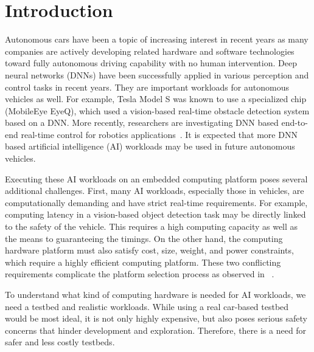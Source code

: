 \section{Introduction} \label{sec:intro}

%
%
Autonomous cars have been a topic of increasing interest in recent
years as many companies are actively developing related hardware
and software technologies toward fully autonomous driving capability with
no human intervention. Deep neural networks (DNNs) have been
successfully applied in various perception and control tasks in
recent years.  They are important workloads for autonomous vehicles
as well. For example, Tesla Model S was known to use a specialized
chip (MobileEye EyeQ), which used a vision-based real-time obstacle
detection system based on a DNN. More recently, researchers 
are investigating DNN based end-to-end real-time control for
robotics applications~\cite{Bojarski2016,Levine2016}. It is expected
that more DNN based artificial intelligence (AI) workloads may be
used in future autonomous vehicles.

Executing these AI workloads on an embedded computing platform 
poses several additional challenges. First, many AI workloads,
especially those in vehicles, are computationally demanding and have
strict real-time requirements.
For example, computing latency in a vision-based object
detection task may be directly linked to the safety of the vehicle. This
requires a high computing capacity as well as the means to guaranteeing
the timings. On the other hand, the computing hardware platform must
also satisfy cost, size, weight, and power constraints, which require a
highly efficient computing platform. These two conflicting
requirements complicate the platform selection process as observed in
~\cite{Otterness2017}.


To understand what kind of computing hardware is needed for AI
workloads, we need a testbed and realistic workloads. While using a
real car-based testbed would be most ideal, it is not only highly
expensive, but also poses serious safety concerns that hinder
development and exploration. Therefore, there is a need for safer and
less costly testbeds.

